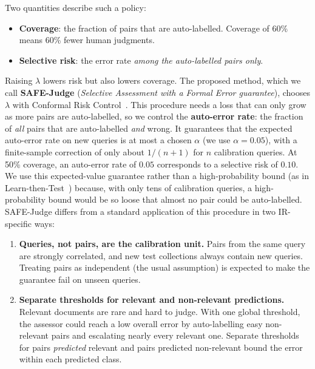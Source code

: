 \documentclass[11pt,a4paper]{article}
\begin{document}
Two quantities describe such a policy:
\begin{itemize}
  \item \textbf{Coverage}: the fraction of pairs that are auto-labelled. Coverage of 60\% means 60\% fewer human judgments.
  \item \textbf{Selective risk}: the error rate \emph{among the auto-labelled pairs only}.
\end{itemize}
Raising $\lambda$ lowers risk but also lowers coverage. The proposed method, which we call \textbf{SAFE-Judge} (\emph{Selective Assessment with a Formal Error guarantee}), chooses $\lambda$ with Conformal Risk Control~\cite{crc}. This procedure needs a loss that can only grow as more pairs are auto-labelled, so we control the \textbf{auto-error rate}: the fraction of \emph{all} pairs that are auto-labelled \emph{and} wrong. It guarantees that the expected auto-error rate on new queries is at most a chosen $\alpha$ (we use $\alpha=0.05$), with a finite-sample correction of only about $1/(n+1)$ for $n$ calibration queries. At 50\% coverage, an auto-error rate of $0.05$ corresponds to a selective risk of $0.10$. We use this expected-value guarantee rather than a high-probability bound (as in Learn-then-Test~\cite{ltt}) because, with only tens of calibration queries, a high-probability bound would be so loose that almost no pair could be auto-labelled. SAFE-Judge differs from a standard application of this procedure in two IR-specific ways:
\begin{enumerate}
  \item \textbf{Queries, not pairs, are the calibration unit.} Pairs from the same query are strongly correlated, and new test collections always contain new queries. Treating pairs as independent (the usual assumption) is expected to make the guarantee fail on unseen queries.
  \item \textbf{Separate thresholds for relevant and non-relevant predictions.} Relevant documents are rare and hard to judge. With one global threshold, the assessor could reach a low overall error by auto-labelling easy non-relevant pairs and escalating nearly every relevant one. Separate thresholds for pairs \emph{predicted} relevant and pairs predicted non-relevant bound the error within each predicted class.
\end{enumerate}
\end{document}
